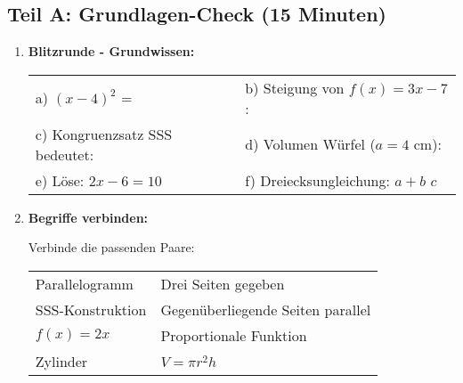 \subsection*{Teil A: Grundlagen-Check (15 Minuten)}

\begin{enumerate}[label=\arabic*.]

    \item \textbf{Blitzrunde - Grundwissen:}

    \begin{tabular}{ll}
        a) $(x - 4)^2$ = \underline{\hspace{4cm}} & b) Steigung von $f(x) = 3x - 7$: \underline{\hspace{2cm}} \\[2ex]
        c) Kongruenzsatz SSS bedeutet: \underline{\hspace{6cm}} & d) Volumen Würfel ($a = 4$ cm): \underline{\hspace{3cm}} \\[2ex]
        e) Löse: $2x - 6 = 10$ \underline{\hspace{4cm}} & f) Dreiecksungleichung: $a + b$ \underline{\hspace{1cm}} $c$ \\[2ex]
    \end{tabular}

    \vspace{1cm}

    \item \textbf{Begriffe verbinden:}

    Verbinde die passenden Paare:

    \begin{tabular}{ll}
        Parallelogramm & \hspace{3cm} Drei Seiten gegeben \\[0.5cm]
        SSS-Konstruktion & \hspace{3cm} Gegenüberliegende Seiten parallel \\[0.5cm]
        $f(x) = 2x$ & \hspace{3cm} Proportionale Funktion \\[0.5cm]
        Zylinder & \hspace{3cm} $V = \pi r^2 h$ \\
    \end{tabular}

\end{enumerate}